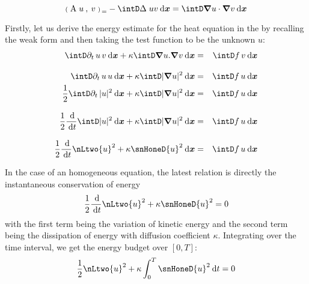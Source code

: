 \begin{equation*}
\InnerP{\matA\;u}{v} = - \intD \Delta\;u v \dxx = \intD \Grad u \cdot \Grad v \dxx
\end{equation*}

Firstly, let us derive the energy estimate for the heat equation in the by recalling the weak form and then taking the test function to be the unknown $u$:
\begin{eqnarray*}
\intD \pdt u\, v \dxx + \kappa \intD \Grad u . \Grad v \dxx &=& \intD f\,v \dxx \\[2ex]
\intD \pdt u\, u \dxx + \kappa \intD | \Grad u |^2 \dxx &=& \intD f\,u \dxx \\
\dfrac{1}{2}\intD \pdt |u|^2 \dxx + \kappa \intD | \Grad u |^2 \dxx &=& \intD f\,u \dxx \\[2ex]
\dfrac{1}{2} \ddd{t} \intD  |u|^2 \dxx + \kappa \intD | \Grad u |^2 \dxx &=& \intD f\,u \dxx \\[2ex]
\dfrac{1}{2} \ddd{t} \nLtwo{u}^2 + \kappa \snHoneD{u}^2 \dxx &=& \intD f\,u \dxx
\end{eqnarray*}

In the case of an homogeneous equation, the latest relation is directly the instantaneous conservation of energy
\begin{equation}
\dfrac{1}{2} \ddd{t} \nLtwo{u}^2 + \kappa \snHoneD{u}^2 = 0
\end{equation}
with the first term being the variation of kinetic energy and the second term being the dissipation of energy with diffusion coefficient $\kappa$.
Integrating over the time interval, we get the energy budget over $[0,T]$:
\begin{equation}\label{eq:energy_budget}
\dfrac{1}{2} \nLtwo{u}^2 + \kappa \int_{0}^T \snHoneD{u}^2 \dt = 0
\end{equation}

